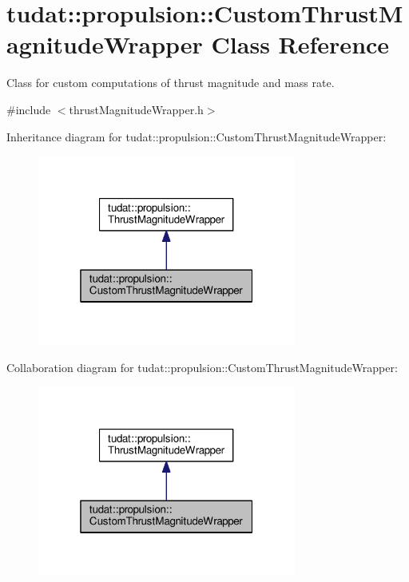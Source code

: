 \hypertarget{classtudat_1_1propulsion_1_1CustomThrustMagnitudeWrapper}{}\section{tudat\+:\+:propulsion\+:\+:Custom\+Thrust\+Magnitude\+Wrapper Class Reference}
\label{classtudat_1_1propulsion_1_1CustomThrustMagnitudeWrapper}


Class for custom computations of thrust magnitude and mass rate.  




{\ttfamily \#include $<$thrust\+Magnitude\+Wrapper.\+h$>$}



Inheritance diagram for tudat\+:\+:propulsion\+:\+:Custom\+Thrust\+Magnitude\+Wrapper\+:
\nopagebreak
\begin{figure}[H]
\begin{center}
\leavevmode
\includegraphics[width=241pt]{classtudat_1_1propulsion_1_1CustomThrustMagnitudeWrapper__inherit__graph}
\end{center}
\end{figure}


Collaboration diagram for tudat\+:\+:propulsion\+:\+:Custom\+Thrust\+Magnitude\+Wrapper\+:
\nopagebreak
\begin{figure}[H]
\begin{center}
\leavevmode
\includegraphics[width=241pt]{classtudat_1_1propulsion_1_1CustomThrustMagnitudeWrapper__coll__graph}
\end{center}
\end{figure}
